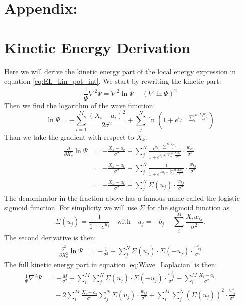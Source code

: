 \documentclass[12pt,a4paper,english]{article}
\begin{document}
\appendix
\section*{Appendix:}
\section{Kinetic Energy Derivation}
\label{appendix:E_k}
Here we will derive the kinetic energy part of the local energy expression in equation \ref{eq:EL_kin_pot_int}. We start by rewriting the kinetic part:
\begin{equation}
\label{eq:Wave_Laplacian}
\frac{1}{\Psi}\nabla^2\Psi=\nabla^2\ln\Psi + (\nabla\ln\Psi)^2
\end{equation}
Then we find the logarithm of the wave function:
\begin{equation}
\ln\Psi=-\sum_{i=1}^{M}\frac{(X_i-a_i)^2}{2\sigma^2}+\sum_{j}^{N}\ln\left(1+e^{b_j + \sum_{i}^{M}\frac{X_iw_{ij}}{\sigma^2}}
\right)
\end{equation}
Than we take the gradient with respect to $X_k$:
\begin{align}
\label{eq:Gradient_Xk}
\frac{\partial }{\partial X_k}\ln\Psi&=-\frac{X_k-a_k}{\sigma^2} + \sum_{j}^{N}\frac{e^{b_j + \sum_{i}^{M}\frac{X_iw_{ij}}{\sigma^2}}}{1+e^{b_j + \sum_{i}^{M}\frac{X_iw_{ij}}{\sigma^2}}}\cdot\frac{w_{kj}}{\sigma^2}\nonumber\\ &=-\frac{X_k-a_k}{\sigma^2} + \sum_{j}^{N}\frac{1}{1+e^{-b_j - \sum_{i}^{M}\frac{X_iw_{ij}}{\sigma^2}}}\cdot\frac{w_{kj}}{\sigma^2}\nonumber\\
&=-\frac{X_k-a_k}{\sigma^2} + \sum_{j}^{N}\Sigma(u_j)\cdot\frac{w_{kj}}{\sigma^2}
\end{align}
The denominator in the fraction above has a famous name called the logistic sigmoid function. For simplicity we will use $\Sigma$ for the sigmoid function as
\begin{equation}
\label{eq:sigmoid}
\Sigma(u_j)=\frac{1}{1+e^{u_j}}\quad \text{with} \quad u_j=-b_j - \sum_{i}^{M}\frac{X_iw_{ij}}{\sigma^2}.
\end{equation}
The second derivative is then:
\begin{align}
\label{eq:2nd_Gradient_Xk}
\frac{\partial^2 }{\partial X_k^2}\ln\Psi&=-\frac{1}{\sigma^2}+\sum_{j}^{N}\Sigma(u_j)\cdot\Sigma(-u_j)\cdot\frac{w_{kj}^2}{\sigma^4}
\end{align}
The full kinetic energy part in equation \ref{eq:Wave_Laplacian} is then:
\begin{align*}
\frac{1}{\Psi}\nabla^2\Psi&= -\frac{M}{\sigma^2} +\sum_{i}^{M}\sum_{j}^{N}\Sigma(u_j)\cdot\Sigma(-u_j)\cdot\frac{w_{ij}^2}{\sigma^4} +\sum_{i}^{M}\frac{X_i-a_i}{\sigma^2}\\ 
&\quad -2\sum_{i}^{M}\frac{X_i-a_i}{\sigma^2}\sum_{j}^{N}\Sigma(u_j)\cdot\frac{w_{ij}}{\sigma^2} 
+\sum_{i}^{M}\sum_{j}^{N}(\Sigma(u_j))^2\cdot\frac{w_{ij}^2}{\sigma^4}
\end{align*}
\end{document}
